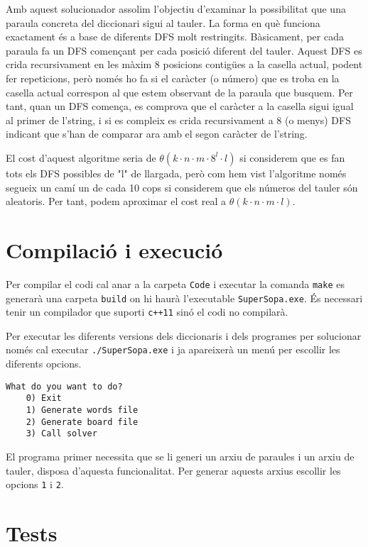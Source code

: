 \documentclass{article}
\begin{document}
Amb aquest solucionador assolim l'objectiu d'examinar la possibilitat que una paraula concreta del diccionari sigui al tauler.
La forma en què funciona exactament és a base de diferents DFS molt restringits. Bàsicament, per cada paraula fa un DFS començant per cada posició diferent del tauler.
Aquest DFS es crida recursivament en les màxim 8 posicions contigües a la casella actual, podent fer repeticions, però només ho fa si el caràcter (o número) que es troba en la casella actual correspon al que estem observant de la paraula que busquem.
Per tant, quan un DFS comença, es comprova que el caràcter a la casella sigui igual al primer de l'string, i si es compleix es crida recursivament a 8 (o menys) DFS indicant que s'han de comparar ara amb el segon caràcter de l'string.

El cost d'aquest algoritme seria de $\theta(k·n·m·8^l·l)$ si considerem que es fan tots els DFS possibles de "l" de llargada, però com hem vist l'algoritme només segueix un camí un de cada 10 cops si considerem que els números del tauler són aleatoris.
Per tant, podem aproximar el cost real a $\theta(k·n·m·l)$.

\section{Compilació i execució}

Per compilar el codi cal anar a la carpeta \verb|Code| i executar la comanda \verb|make| es generarà una carpeta \verb|build| on hi haurà l'executable \verb|SuperSopa.exe|. És necessari tenir un compilador que suporti \verb|c++11| sinó el codi no compilarà.

Per executar les diferents versions dels diccionaris i dels programes per solucionar només cal executar \verb|./SuperSopa.exe| i ja apareixerà un menú per escollir les diferents opcions. 

\begin{lstlisting}[frame=single]
	What do you want to do?
	0) Exit
	1) Generate words file
	2) Generate board file
	3) Call solver
\end{lstlisting}

El programa primer necessita que se li generi un arxiu de paraules i un arxiu de tauler, disposa d'aquesta funcionalitat. Per generar aquests arxius escollir les opcions \verb|1| i \verb|2|.

\section{Tests}
\end{document}
